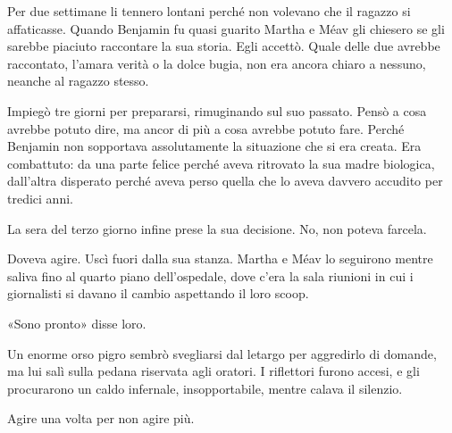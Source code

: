 Per due settimane li tennero lontani perché non volevano che il ragazzo si affaticasse. Quando
Benjamin fu quasi guarito Martha e Méav gli chiesero se gli sarebbe piaciuto raccontare la sua
storia. Egli accettò. Quale delle due avrebbe raccontato, l’amara verità o la dolce bugia, non era
ancora chiaro a nessuno, neanche al ragazzo stesso.

Impiegò tre giorni per prepararsi, rimuginando sul suo passato. Pensò a cosa avrebbe potuto dire, ma
ancor di più a cosa avrebbe potuto fare. Perché Benjamin non sopportava assolutamente la situazione
che si era creata. Era combattuto: da una parte felice perché aveva ritrovato la sua madre
biologica, dall’altra disperato perché aveva perso quella che lo aveva davvero accudito per tredici
anni.

La sera del terzo giorno infine prese la sua decisione. No, non poteva farcela.

Doveva agire. Uscì fuori dalla sua stanza. Martha e Méav lo seguirono mentre saliva fino al quarto
piano dell’ospedale, dove c’era la sala riunioni in cui i giornalisti si davano il cambio aspettando
il loro scoop.

«Sono pronto» disse loro.

Un enorme orso pigro sembrò svegliarsi dal letargo per aggredirlo di domande, ma lui salì sulla
pedana riservata agli oratori. I riflettori furono accesi, e gli procurarono un caldo infernale,
insopportabile, mentre calava il silenzio.

Agire una volta per non agire più.
